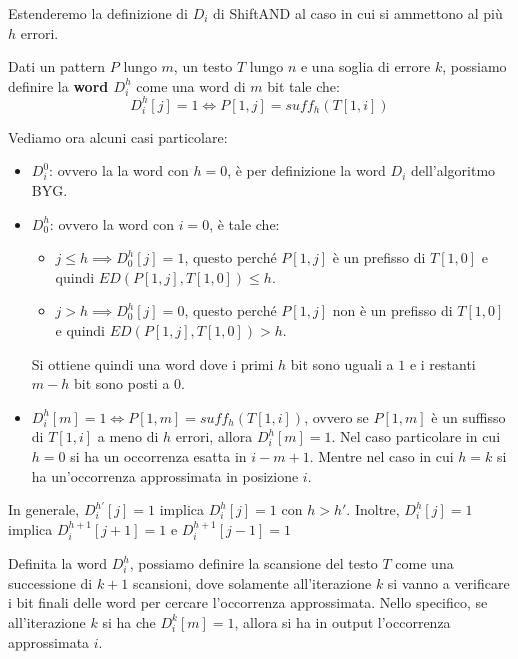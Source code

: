 Estenderemo la definizione di $D_i$ di ShiftAND al caso in cui si ammettono al più $h$ errori.
\begin{definizione}
    Dati un pattern $P$ lungo $m$, un testo $T$ lungo $n$ e una soglia di errore $k$,
    possiamo definire la \textbf{word $D_i^h$} come una word di $m$ bit tale che:
    \begin{equation}
        D_i^h[j] = 1 \iff P[1, j] = suff_h(T[1, i])
    \end{equation}
\end{definizione}
Vediamo ora alcuni casi particolare:
\begin{itemize}
    \item $D_i^0$: ovvero la la word con $h = 0$, è per definizione la word $D_i$
          dell'algoritmo BYG.
    \item $D_0^h$: ovvero la word con $i = 0$, è tale che:
          \begin{itemize}
              \item $j \leq h \implies D_0^h[j] = 1$, questo perché $P[1, j]$ è un
                    prefisso di $T[1, 0]$ e quindi $ED(P[1, j], T[1, 0]) \leq h$.
              \item $j > h \implies D_0^h[j] = 0$, questo perché $P[1, j]$ non è un
                    prefisso di $T[1, 0]$ e quindi $ED(P[1, j], T[1, 0]) > h$.
          \end{itemize}
          Si ottiene quindi una word dove i primi $h$ bit sono uguali a $1$ e i
          restanti $m - h$ bit sono posti a $0$.
    \item $D_i^h [m] = 1 \iff P[1, m] = suff_h(T[1, i])$, ovvero se $P[1, m]$ è un
          suffisso di $T[1, i]$ a meno di $h$ errori, allora $D_i^h[m] = 1$. Nel
          caso particolare in cui $h = 0$ si ha un occorrenza esatta in $i - m + 1$.
          Mentre nel caso in cui $h = k$ si ha un'occorrenza approssimata in posizione $i$.
\end{itemize}
\begin{nota}
    In generale, $D_i^{h'}[j] = 1$ implica $D_i^{h}[j] = 1$ con $h > h'$. Inoltre,
    $D_{i}^{h} [j] = 1$ implica $D_{i}^{h + 1}[j + 1] = 1$ e $D_{i}^{h + 1}[j - 1] = 1$
\end{nota}
Definita la word $D_i^h$, possiamo definire la scansione del testo $T$ come una
successione di $k + 1$ scansioni, dove solamente all'iterazione $k$ si vanno a
verificare i bit finali delle word per cercare l'occorrenza approssimata.
Nello specifico, se all'iterazione $k$ si ha che $D_i^k[m] = 1$, allora si ha in
output l'occorrenza approssimata $i$.


